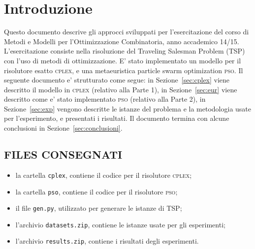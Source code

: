 \documentclass[
12pt, %
a4paper, %
oneside, %
headinclude,footinclude, %
BCOR5mm, %
]{scrartcl}
\begin{document}





\section{Introduzione}

Questo documento descrive gli approcci sviluppati per l'esercitazione del corso di Metodi e Modelli per l'Ottimizzazione Combinatoria, anno accademico 14/15. L'esercitazione consiste nella risoluzione del  Traveling Salesman Problem (TSP) con l'uso di metodi di ottimizzazione. E' stato implementato un modello per il risolutore esatto \textsc{cplex}, e una metaeuristica particle swarm optimization \textsc{pso}. Il seguente documento e' strutturato come segue: in Sezione~\ref{sec:cplex} viene descritto il modello in \textsc{cplex} (relativo alla Parte 1), in Sezione~\ref{sec:eur} viene descritto come e' stato implementato \textsc{pso} (relativo alla Parte 2), in Sezione~\ref{sec:exp} vengono descritte le istanze del problema e la metodologia usate per l'esperimento, e presentati i risultati. Il documento termina con alcune conclusioni in Sezione~\ref{sec:conclusioni}.

\subsection{FILES CONSEGNATI} 
\begin{itemize}
\setlength\itemsep{0.05cm}
\item la cartella \texttt{cplex}, contiene il codice per il risolutore \textsc{cplex};
\item la cartella \texttt{pso}, contiene il codice per il risolutore \textsc{pso};
\item il file \texttt{gen.py}, utilizzato per generare le istanze di TSP;
\item l'archivio \texttt{datasets.zip}, contiene le istanze usate per gli esperimenti;
\item l'archivio \texttt{results.zip}, contiene i risultati degli esperimenti.
\end{itemize}
\end{document}
